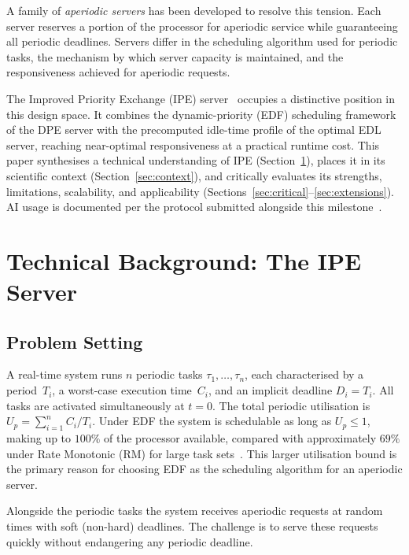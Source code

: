 \documentclass[conference]{IEEEtran}
\begin{document}
A family of \emph{aperiodic servers} has been developed to
resolve this tension. Each server reserves a portion of the
processor for aperiodic service while guaranteeing all periodic
deadlines. Servers differ in the scheduling algorithm used for
periodic tasks, the mechanism by which server capacity is
maintained, and the responsiveness achieved for aperiodic
requests.

The Improved Priority Exchange (IPE) server~\cite{spuri1996}
occupies a distinctive position in this design space. It
combines the dynamic-priority (EDF) scheduling framework of
the DPE server with the precomputed idle-time profile of the
optimal EDL server, reaching near-optimal responsiveness at a
practical runtime cost. This paper synthesises a technical
understanding of IPE (Section~\ref{sec:technical}), places it
in its scientific context (Section~\ref{sec:context}), and
critically evaluates its strengths, limitations, scalability,
and applicability (Sections~\ref{sec:critical}--\ref{sec:extensions}).
AI usage is documented per the protocol submitted alongside
this milestone~\cite{ai_protocol_m4}.

\section{Technical Background: The IPE Server}
\label{sec:technical}

\subsection{Problem Setting}

A real-time system runs $n$ periodic tasks
$\tau_1,\ldots,\tau_n$, each characterised by a period~$T_i$,
a worst-case execution time~$C_i$, and an implicit deadline
$D_i = T_i$. All tasks are activated simultaneously at
$t = 0$. The total periodic utilisation is
$U_p = \sum_{i=1}^{n} C_i/T_i$. Under EDF the system is
schedulable as long as $U_p \leq 1$, making up to $100\%$ of
the processor available, compared with approximately $69\%$
under Rate Monotonic (RM) for large task
sets~\cite{buttazzo2011}. This larger utilisation bound is the
primary reason for choosing EDF as the scheduling algorithm
for an aperiodic server.

Alongside the periodic tasks the system receives aperiodic
requests at random times with soft (non-hard) deadlines. The
challenge is to serve these requests quickly without
endangering any periodic deadline.
\end{document}
